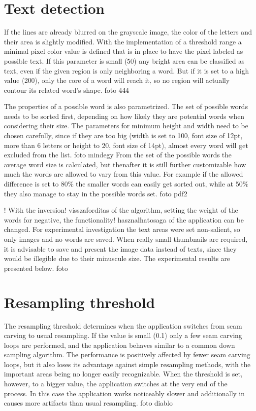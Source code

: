 \documentclass[draft,final]{vutinfth} %
\begin{document}
	\section{Text detection}
	If the lines are already blurred on the grayscale image, the color of the letters and their area is slightly modified. 
	With the implementation of a threshold range a minimal pixel color value is defined that is in place to have the pixel labeled as possible text.
	If this parameter is small (50) any bright area can be classified as text, even if the given region is only neighboring a word.
	But if it is set to a high value (200), only the core of a word will reach it, so no region will actually contour its related word's shape.
	foto 444\par
	The properties of a possible word is also parametrized.
	The set of possible words needs to be sorted first, depending on how likely they are potential words when considering their size.
	The parameters for minimum height and width need to be chosen carefully, since if they are too big (width is set to 100, font size of 12pt, more than 6 letters or height to 20, font size of 14pt), almost every word will get excluded from the list.
	foto mindegy 
	From the set of the possible words the average word size is calculated, but thenafter it is still further customizable how much the words are allowed to vary from this value.
	For example if the allowed difference is set to 80\% the smaller words can easily get sorted out, while at 50\% they also manage to stay in the possible words set.
	foto pdf2\par 
	! With the inversion! visszaforditas of the algorithm, setting the weight of the words for negative, the functionality! hasznalhatosaga of the application can be changed.
	For experimental investigation the text areas were set non-salient, so only images and no words are saved. 
	When really small thumbnails are required, it  is advisable to save and present the image data instead of texts, since they would be illegible due to their minuscule size.  
	The experimental results are presented below.
	foto 
	\section{Resampling threshold}
	The resampling threshold determines when the application switches from seam carving to usual resampling. 
	If the value is small (0.1) only a few seam carving loops are performed, and the application behaves similar to a common down sampling algorithm.
	The performance is positively affected by fewer seam carving loops, but it also loses its advantage against simple resampling methods, with the important areas being no longer easily recognizable.
	When the threshold is set, however, to a bigger value, the application switches at the very end of the process.
	In this case the application works noticeably slower and additionally in causes more artifacts than usual resampling.
	foto diablo 
\end{document}
